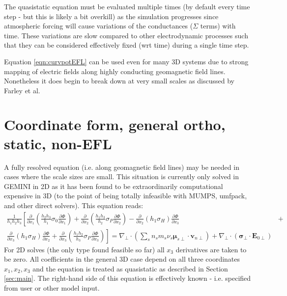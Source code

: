\documentclass[11pt,letterpaper]{article}
\begin{document}
The quasistatic equation must be evaluated multiple times (by default every time step - but this is likely a bit overkill) as the simulation progresses since atmospheric forcing will cause variations of the conductances ($\Sigma$ terms) with time.  These variations are slow compared to other electrodynamic processes such that they can be considered effectively fixed (wrt time) during a single time step.

Equation \ref{eqn:curvpotEFL} can be used even for many 3D systems due to strong mapping of electric fields along highly conducting geomagnetic field lines.  Nonetheless it does begin to break down at very small scales as discussed by Farley et al.  


\section{Coordinate form, general ortho, static, non-EFL}

A fully resolved equation (i.e. along geomagnetic field lines) may be needed in cases where the scale sizes are small.  This situation is currently only solved in GEMINI in 2D as it has been found to be extraordinarily computational expensive in 3D (to the point of being totally infeasible with MUMPS, umfpack, and other direct solvers).  This equation reads:  
\begin{eqnarray}
\frac{1}{h_1 h_2 h_3} \left[ \frac{\partial}{\partial x_1} \left( \frac{h_2 h_3}{h_1} \sigma_0 \frac{\partial \Phi}{\partial x_1} \right) + \frac{\partial}{\partial x_2} \left( \frac{h_1 h_3}{h_2} \sigma_P \frac{\partial \Phi}{\partial x_2} \right) -  \right. \frac{\partial}{\partial x_2} \left( h_1 \sigma_H \right) \frac{\partial \Phi}{\partial x_3} &+& \nonumber \\ \left. \frac{\partial}{\partial x_3} \left( h_1 \sigma_H \right) \frac{\partial \Phi}{\partial x_2} + \frac{\partial}{\partial x_3} \left( \frac{h_1 h_2}{h_3} \sigma_P \frac{\partial \Phi}{\partial x_3} \right)
\right]  = \nabla_\perp \cdot \left( \sum_s n_s m_s \nu_s \boldsymbol{\mu}_{s\perp} \cdot \mathbf{v}_{n\perp} \right) + \nabla_\perp \cdot \left( \boldsymbol{\sigma}_\perp \cdot \mathbf{E}_{0\perp} \right) \label{eqn:curvpot}
\end{eqnarray}
For 2D solves (the only type found feasible so far) all $x_3$ derivatives are taken to be zero.  All coefficients in the general 3D case depend on all three coordinates $x_1,x_2,x_3$ and the equation is treated as quasistatic as described in Section \ref{sec:main}.  The right-hand side of this equation is effectively known - i.e. specified from user or other model input.  
\end{document}
